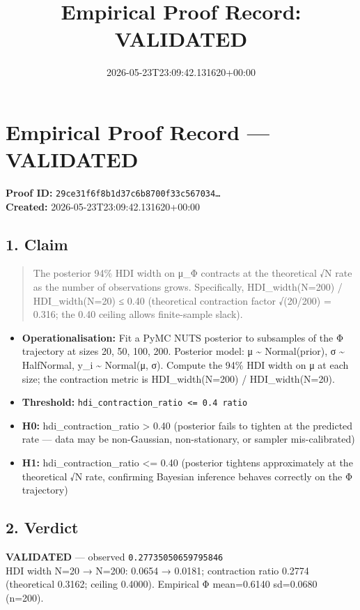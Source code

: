 \documentclass{article}
\title{Empirical Proof Record: VALIDATED}
\date{2026-05-23T23:09:42.131620+00:00}
\begin{document}
\maketitle
\section*{Empirical Proof Record --- \textcolor{validated}{\textbf{VALIDATED}}}
\textbf{Proof ID:} \texttt{29ce31f6f8b1d37c6b8700f33c567034\dots}\\
\textbf{Created:} 2026-05-23T23:09:42.131620+00:00
\subsection*{1. Claim}
\begin{quote}The posterior 94\% HDI width on μ\_Φ contracts at the theoretical √N rate as the number of observations grows. Specifically, HDI\_width(N=200) / HDI\_width(N=20) ≤ 0.40 (theoretical contraction factor √(20/200) = 0.316; the 0.40 ceiling allows finite-sample slack).\end{quote}
\begin{itemize}
\item \textbf{Operationalisation:} Fit a PyMC NUTS posterior to subsamples of the Φ trajectory at sizes 20, 50, 100, 200. Posterior model: μ \textasciitilde{} Normal(prior), σ \textasciitilde{} HalfNormal, y\_i \textasciitilde{} Normal(μ, σ). Compute the 94\% HDI width on μ at each size; the contraction metric is HDI\_width(N=200) / HDI\_width(N=20).
\item \textbf{Threshold:} \texttt{hdi\_contraction\_ratio <= 0.4 ratio}
\item \textbf{H0:} hdi\_contraction\_ratio > 0.40 (posterior fails to tighten at the predicted rate — data may be non-Gaussian, non-stationary, or sampler mis-calibrated)
\item \textbf{H1:} hdi\_contraction\_ratio <= 0.40 (posterior tightens approximately at the theoretical √N rate, confirming Bayesian inference behaves correctly on the Φ trajectory)
\end{itemize}
\subsection*{2. Verdict}
\textcolor{validated}{\textbf{VALIDATED}} --- observed \texttt{0.27735050659795846}\\
HDI width N=20 → N=200: 0.0654 → 0.0181; contraction ratio 0.2774 (theoretical 0.3162; ceiling 0.4000). Empirical Φ mean=0.6140 sd=0.0680 (n=200).
\end{document}
